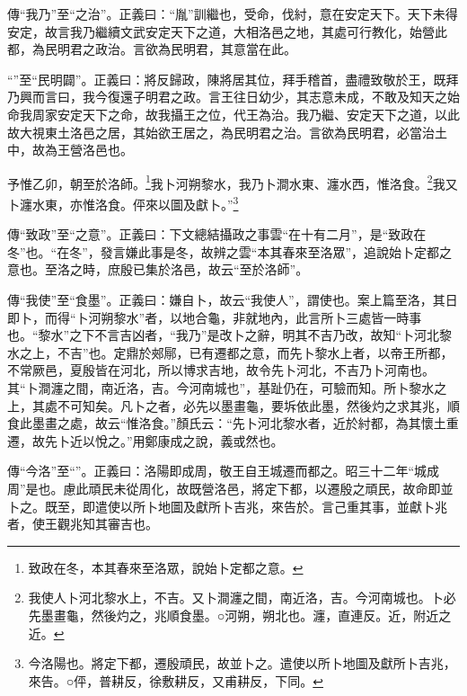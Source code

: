 {\noindent\zhuan{}\fzbyks 傳“我乃”至“之治”。正義曰：“胤”訓繼也，受命，伐紂，意在安定天下。天下未得安定，故言我乃繼續文武安定天下之道，大相洛邑之地，其處可行教化，始營此都，為民明君之政治。言欲為民明君，其意當在此。 \par}

{\noindent\shu{}\fzkt “”至“民明闢”。正義曰：將反歸政，陳將居其位，拜手稽首，盡禮致敬於王，既拜乃興而言曰，我今復還子明君之政。言王往日幼少，其志意未成，不敢及知天之始命我周家安定天下之命，故我攝王之位，代王為治。我乃繼、安定天下之道，以此故大視東土洛邑之居，其始欲王居之，為民明君之治。言欲為民明君，必當治土中，故為王營洛邑也。 \par}

予惟乙卯，朝至於洛師。\footnote{致政在冬，本其春來至洛眾，說始卜定都之意。}我卜河朔黎水，我乃卜澗水東、瀍水西，惟洛食。\footnote{我使人卜河北黎水上，不吉。又卜澗瀍之間，南近洛，吉。今河南城也。卜必先墨畫龜，然後灼之，兆順食墨。○河朔，朔北也。瀍，直連反。近，附近之近。}我又卜瀍水東，亦惟洛食。伻來以圖及獻卜。”\footnote{今洛陽也。將定下都，遷殷頑民，故並卜之。遣使以所卜地圖及獻所卜吉兆，來告。○伻，普耕反，徐敷耕反，又甫耕反，下同。}


{\noindent\zhuan{}\fzbyks 傳“致政”至“之意”。正義曰：下文總結攝政之事雲“在十有二月”，是“致政在冬”也。“在冬”，發言嫌此事是冬，故辨之雲“本其春來至洛眾”，追說始卜定都之意也。至洛之時，庶殷已集於洛邑，故云“至於洛師”。 \par}

{\noindent\zhuan{}\fzbyks 傳“我使”至“食墨”。正義曰：嫌自卜，故云“我使人”，謂使也。案上篇至洛，其日即卜，而得“卜河朔黎水”者，以地合龜，非就地內，此言所卜三處皆一時事也。“黎水”之下不言吉凶者，“我乃”是改卜之辭，明其不吉乃改，故知“卜河北黎水之上，不吉”也。定鼎於郟鄏，已有遷都之意，而先卜黎水上者，以帝王所都，不常厥邑，夏殷皆在河北，所以博求吉地，故令先卜河北，不吉乃卜河南也。其“卜澗瀍之間，南近洛，吉。今河南城也”，基趾仍在，可驗而知。所卜黎水之上，其處不可知矣。凡卜之者，必先以墨畫龜，要坼依此墨，然後灼之求其兆，順食此墨畫之處，故云“惟洛食。”顏氏云：“先卜河北黎水者，近於紂都，為其懷土重遷，故先卜近以悅之。”用鄭康成之說，義或然也。 \par}

{\noindent\zhuan{}\fzbyks 傳“今洛”至“”。正義曰：洛陽即成周，敬王自王城遷而都之。昭三十二年“城成周”是也。慮此頑民未從周化，故既營洛邑，將定下都，以遷殷之頑民，故命即並卜之。既至，即遣使以所卜地圖及獻所卜吉兆，來告於。言己重其事，並獻卜兆者，使王觀兆知其審吉也。 \par}

